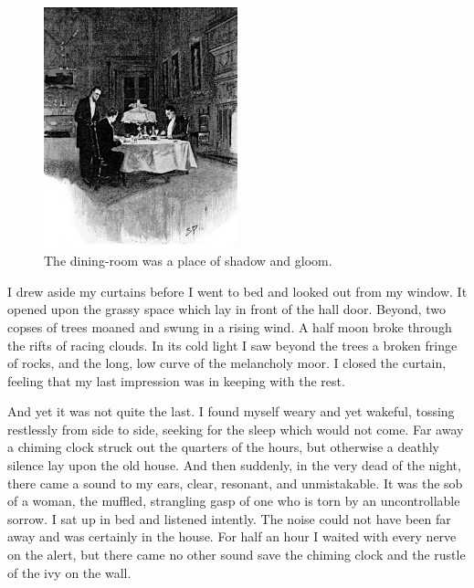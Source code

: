 \documentclass[paper=a5,BCOR=7mm,twoside,DIV=calc,12pt,usegeometry,openany,chapterprefix,endperiod,headings=big]{scrbook} %
\begin{document}
\begin{figure}[tbh]
\centering
\includegraphics[width=0.5\textwidth]{06_diningroom}
\caption{The dining-room was a place of shadow and gloom.}
\end{figure}

I drew aside my curtains before I went to bed and looked out from my window. It opened upon the grassy space which lay in front of the hall door. Beyond, two copses of trees moaned and swung in a rising wind. A half moon broke through the rifts of racing clouds. In its cold light I saw beyond the trees a broken fringe of rocks, and the long, low curve of the melancholy moor. I closed the curtain, feeling that my last impression was in keeping with the rest.

And yet it was not quite the last. I found myself weary and yet wakeful, tossing restlessly from side to side, seeking for the sleep which would not come. Far away a chiming clock struck out the quarters of the hours, but otherwise a deathly silence lay upon the old house. And then suddenly, in the very dead of the night, there came a sound to my ears, clear, resonant, and unmistakable. It was the sob of a woman, the muffled, strangling gasp of one who is torn by an uncontrollable sorrow. I sat up in bed and listened intently. The noise could not have been far away and was certainly in the house. For half an hour I waited with every nerve on the alert, but there came no other sound save the chiming clock and the rustle of the ivy on the wall.


\end{document}

